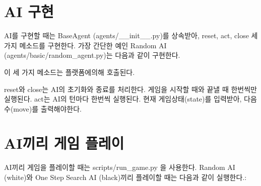 \documentclass[letterpaper,10pt,english]{sphinxmanual}
\begin{document}
\section{AI 구현}
\label{\detokenize{index:ai}}
AI를 구현할 때는 BaseAgent (agents/\_\_init\_\_.py)를 상속받아, reset, act, close 세 가지 메소드를 구현한다.
가장 간단한 예인 Random AI (agents/basic/random\_agent.py)는 다음과 같이 구현한다.

%
\begin{sphinxVerbatim}[commandchars=\\\{\}]
 
   
    

 


     

      
          
         

     
\end{sphinxVerbatim}

이 세 가지 메소드는 플랫폼에의해 호출된다.

reset와 close는 AI의 초기화와 종료를 처리한다. 게임을 시작할 때와 끝낼 때 한번씩만 실행된다.
act는 AI의 턴마다 한번씩 실행된다. 현재 게임상태(state)를 입력받아, 다음 수(move)를 출력해야한다.


\section{AI끼리 게임 플레이}
\label{\detokenize{index:id3}}
AI끼리 게임을 플레이할 때는 scripts/run\_game.py 을 사용한다. Random AI (white)와 One Step Search AI (black)끼리 플레이할 때는 다음과 같이 실행한다.:

%
\begin{sphinxVerbatim}[commandchars=\\\{\}]
   
\end{sphinxVerbatim}
\end{document}
